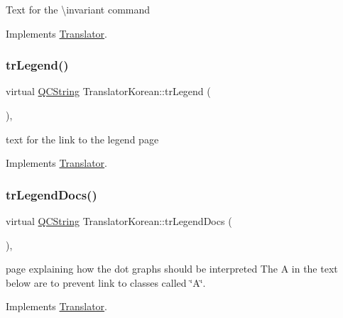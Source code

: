 Text for the \textbackslash{}invariant command 

Implements \mbox{\hyperlink{class_translator}{Translator}}.

\mbox{\label{class_translator_korean_a86598f68ad4cf61ff99125b1c7a35cab}} 
\subsubsection{\texorpdfstring{trLegend()}{trLegend()}}
{\footnotesize\ttfamily virtual \mbox{\hyperlink{class_q_c_string}{Q\+C\+String}} Translator\+Korean\+::tr\+Legend (\begin{DoxyParamCaption}{ }\end{DoxyParamCaption})\hspace{0.3cm}{\ttfamily [inline]}, {\ttfamily [virtual]}}

text for the link to the legend page 

Implements \mbox{\hyperlink{class_translator}{Translator}}.

\mbox{\label{class_translator_korean_acedc5de6772bc4d5970b4834b40702ea}} 
\subsubsection{\texorpdfstring{trLegendDocs()}{trLegendDocs()}}
{\footnotesize\ttfamily virtual \mbox{\hyperlink{class_q_c_string}{Q\+C\+String}} Translator\+Korean\+::tr\+Legend\+Docs (\begin{DoxyParamCaption}{ }\end{DoxyParamCaption})\hspace{0.3cm}{\ttfamily [inline]}, {\ttfamily [virtual]}}

page explaining how the dot graph\textquotesingle{}s should be interpreted The A in the text below are to prevent link to classes called \char`\"{}\+A\char`\"{}. 

Implements \mbox{\hyperlink{class_translator}{Translator}}.

\mbox{\label{class_translator_korean_adcc36a0092e43e6de666d8279594994a}} 
